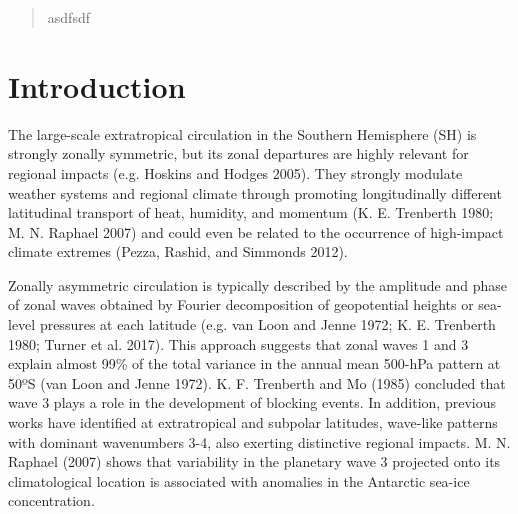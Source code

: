 \documentclass[smallextended]{svjour3}       %
\begin{document}
\date{Received: date / Accepted: date}


\maketitle

\begin{abstract}
asdfsdf
\\


\end{abstract}


\def\spacingset#1{\renewcommand{\baselinestretch}%
{#1}\small\normalsize} \spacingset{1}


\hypertarget{introduction}{%
\section{Introduction}\label{introduction}}

The large-scale extratropical circulation in the Southern Hemisphere (SH) is strongly zonally symmetric, but its zonal departures are highly relevant for regional impacts (e.g. Hoskins and Hodges 2005).
They strongly modulate weather systems and regional climate through promoting longitudinally different latitudinal transport of heat, humidity, and momentum (K. E. Trenberth 1980; M. N. Raphael 2007) and could even be related to the occurrence of high-impact climate extremes (Pezza, Rashid, and Simmonds 2012).

Zonally asymmetric circulation is typically described by the amplitude and phase of zonal waves obtained by Fourier decomposition of geopotential heights or sea-level pressures at each latitude (e.g. van Loon and Jenne 1972; K. E. Trenberth 1980; Turner et al. 2017).
This approach suggests that zonal waves 1 and 3 explain almost 99\% of the total variance in the annual mean 500-hPa pattern at 50ºS (van Loon and Jenne 1972).
K. F. Trenberth and Mo (1985) concluded that wave 3 plays a role in the development of blocking events.
In addition, previous works have identified at extratropical and subpolar latitudes, wave-like patterns with dominant wavenumbers 3-4, also exerting distinctive regional impacts.
M. N. Raphael (2007) shows that variability in the planetary wave 3 projected onto its climatological location is associated with anomalies in the Antarctic sea-ice concentration.
\end{document}
